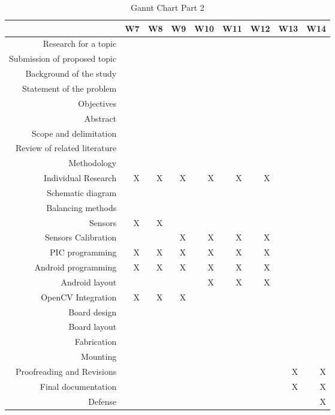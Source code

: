 \begin{table}[htbp]
  \centering
  \caption{Gannt Chart Part 2}
    \begin{tabular}{rrrrrrrrr}
    \toprule
      &       W7 &       W8 &       W9 &       W10 &       W11 &       W12 &       W13 &       W14 \\
    \midrule
    Research for a topic &   &   &   &   &   &   &   &  \\
    Submission of proposed topic &   &   &   &   &   &   &   &  \\
    Background of the study &   &   &   &   &   &   &   &  \\
    Statement of the problem &   &   &   &   &   &   &   &  \\
    Objectives &   &   &   &   &   &   &   &  \\
    Abstract &   &   &   &   &   &   &   &  \\
    Scope and delimitation &   &   &   &   &   &   &   &  \\
    Review of related literature &   &   &   &   &   &   &   &  \\
    Methodology &   &   &   &   &   &   &   &  \\
    Individual Research & X & X & X & X & X & X &   &  \\
    Schematic diagram &   &   &   &   &   &   &   &  \\
    Balancing methods &   &   &   &   &   &   &   &  \\
    Sensors & X & X &   &   &   &   &   &  \\
    Sensors Calibration &   &   & X & X & X & X &   &  \\
    PIC programming & X & X & X & X & X & X &   &  \\
    Android programming & X & X & X & X & X & X &   &  \\
    Android layout &   &   &   & X & X & X &   &  \\
    OpenCV Integration & X & X & X &   &   &   &   &  \\
    Board design &   &   &   &   &   &   &   &  \\
    Board layout &   &   &   &   &   &   &   &  \\
    Fabrication &   &   &   &   &   &   &   &  \\
    Mounting &   &   &   &   &   &   &   &  \\
    Proofreading and Revisions &   &   &   &   &   &   & X & X \\
    Final documentation &   &   &   &   &   &   & X & X \\
    Defense &   &   &   &   &   &   &   & X \\
    \bottomrule
    \end{tabular}%
  \label{tab:addlabel}%
\end{table}%

